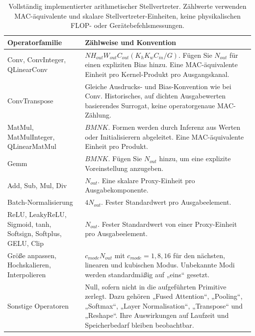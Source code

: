 \begin{table}[H]
\centering\small\TableSetup
\caption{Vollständig implementierter arithmetischer Stellvertreter. Zählwerte verwenden MAC-äquivalente und skalare Stellvertreter-Einheiten, keine physikalischen FLOP- oder Gerätebefehlsmessungen.}
\label{tab:flop_formulas_landscape}
\begin{tabularx}{\linewidth}{@{}L{3.5cm}Y@{}}
\toprule
Operatorfamilie & Zählweise und Konvention \\
\midrule
Conv, ConvInteger, QLinearConv & $NH_{out}W_{out}C_{out}(K_hK_wC_{in}/G)$. Fügen Sie $N_{out}$ für einen expliziten Bias hinzu. Eine MAC-äquivalente Einheit pro Kernel-Produkt pro Ausgangskanal. \\
ConvTranspose & Gleiche Ausdrucks- und Bias-Konvention wie bei Conv. Historisches, auf dichten Ausgabewerten basierendes Surrogat, keine operatorgenaue MAC-Zählung. \\
MatMul, MatMulInteger, QLinearMatMul & $BMNK$. Formen werden durch Inferenz aus Werten oder Initialisierern abgeleitet. Eine MAC-äquivalente Einheit pro Produkt. \\
Gemm & $BMNK$. Fügen Sie $N_{out}$ hinzu, um eine explizite Voreinstellung anzugeben. \\
Add, Sub, Mul, Div & $N_{out}$. Eine skalare Proxy-Einheit pro Ausgabekomponente. \\
Batch-Normalisierung & $4N_{out}$. Fester Standardwert pro Ausgabeelement. \\
ReLU, LeakyReLU, Sigmoid, tanh, Softsign, Softplus, GELU, Clip & $N_{out}$. Fester Standardwert von einer Proxy-Einheit pro Ausgabeelement. \\
Größe anpassen, Hochskalieren, Interpolieren & $c_{mode}N_{out}$ mit $c_{mode}=1,8,16$ für den nächsten, linearen und kubischen Modus. Unbekannte Modi werden standardmäßig auf „eins“ gesetzt. \\
Sonstige Operatoren & Null, sofern nicht in die aufgeführten Primitive zerlegt. Dazu gehören „Fused Attention“, „Pooling“, „Softmax“, „Layer Normalisation“, „Transpose“ und „Reshape“. Ihre Auswirkungen auf Laufzeit und Speicherbedarf bleiben beobachtbar. \\
\bottomrule
\end{tabularx}
\end{table}
